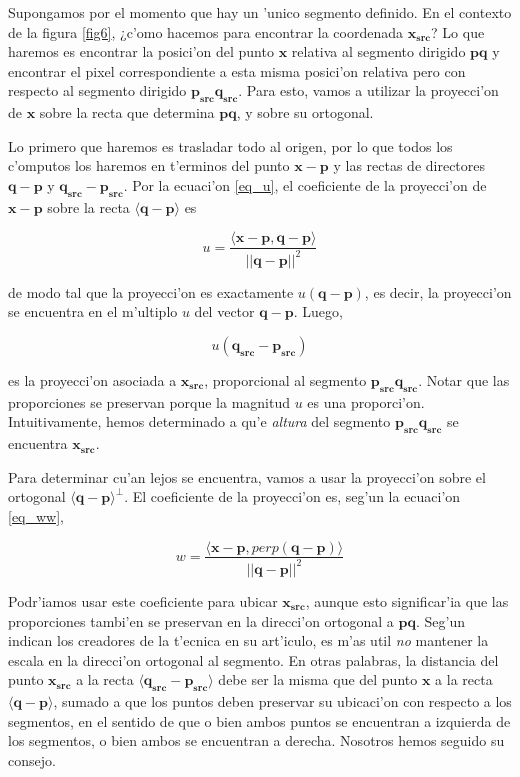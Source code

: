 Supongamos por el momento que hay un 'unico segmento definido. En el contexto de la figura \ref{fig6}, ¿c'omo hacemos para encontrar la coordenada $\mathbf{x_{src}}$? Lo que haremos es encontrar la posici'on del punto $\mathbf{x}$ relativa al segmento dirigido $\mathbf{pq}$ y encontrar el pixel correspondiente a esta misma posici'on relativa pero con respecto al segmento dirigido $\mathbf{p_{src}q_{src}}$. Para esto, vamos a utilizar la proyecci'on de $\mathbf{x}$ sobre la recta que determina $\mathbf{pq}$, y sobre su ortogonal.

Lo primero que haremos es trasladar todo al origen, por lo que todos los c'omputos los haremos en t'erminos del punto $\mathbf{x} - \mathbf{p}$ y las rectas de directores $\mathbf{q} - \mathbf{p}$ y $\mathbf{q_{src}} - \mathbf{p_{src}}$. Por la ecuaci'on \ref{eq_u}, el coeficiente de la proyecci'on de $\mathbf{x} - \mathbf{p}$ sobre la recta $\langle \mathbf{q} - \mathbf{p} \rangle$ es

\begin{equation}
u = \frac{\langle \mathbf{x} - \mathbf{p}, \mathbf{q} - \mathbf{p} \rangle}{||\mathbf{q} - \textbf{p}||^2}
\label{eq_u_posta}
\end{equation}

\noindent
de modo tal que la proyecci'on es exactamente $u (\mathbf{q} - \mathbf{p})$, es decir, la proyecci'on se encuentra en el m'ultiplo $u$ del vector $\mathbf{q} - \mathbf{p}$. Luego,

\begin{equation}
u (\mathbf{q_{src}} - \mathbf{p_{src}})
\label{eq_qp}
\end{equation}

\noindent
es la proyecci'on asociada a $\mathbf{x_{src}}$, proporcional al segmento $\mathbf{p_{src}q_{src}}$. Notar que las proporciones se preservan porque la magnitud $u$ es una proporci'on. Intuitivamente, hemos determinado a qu'e \textit{altura} del segmento $\mathbf{p_{src}q_{src}}$ se encuentra $\mathbf{x_{src}}$.

Para determinar cu'an lejos se encuentra, vamos a usar la proyecci'on sobre el ortogonal $\langle \mathbf{q} - \mathbf{p} \rangle^{\perp}$. El coeficiente de la proyecci'on es, seg'un la ecuaci'on \ref{eq_ww},

\[w = \frac{\langle \mathbf{x} - \mathbf{p}, perp(\mathbf{q} - \mathbf{p}) \rangle}{||\mathbf{q} - \mathbf{p}||^2}\]

Podr'iamos usar este coeficiente para ubicar $\mathbf{x_{src}}$, aunque esto significar'ia que las proporciones tambi'en se preservan en la direcci'on ortogonal a $\mathbf{pq}$. Seg'un indican los creadores de la t'ecnica en su art'iculo, es m'as util \emph{no} mantener la escala en la direcci'on ortogonal al segmento. En otras palabras, la distancia del punto $\mathbf{x_{src}}$ a la recta $\langle \mathbf{q_{src}} - \mathbf{p_{src}} \rangle$ debe ser la misma que del punto $\mathbf{x}$ a la recta $\langle \mathbf{q} - \mathbf{p} \rangle$, sumado a que los puntos deben preservar su ubicaci'on con respecto a los segmentos, en el sentido de que o bien ambos puntos se encuentran a izquierda de los segmentos, o bien ambos se encuentran a derecha. Nosotros hemos seguido su consejo.


